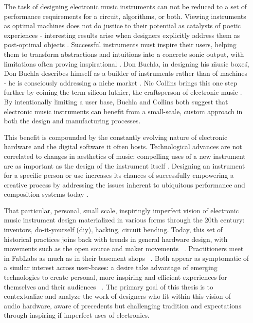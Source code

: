 The task of designing electronic music instruments can not be reduced to a set of performance requirements for a circuit, algorithms, or both. Viewing instruments as optimal machines does not do justice to their potential as catalysts of poetic experiences - interesting results arise when designers explicitly address them as post-optimal objects \cite{dunne2005}. Successful instruments must inspire their users, helping them to transform abstractions and intuitions into a concrete sonic output, with limitations often proving inspirational \cite{evens2005,rovan2009}. Don Buchla, in designing his \"music boxes\", Don Buchla describes himself as a builder of instruments rather than of machines - he is consciously addressing a niche market \cite{pinch2001}. Nic Collins brings this one step further by coining the term silicon luthier, the craftsperson of electronic music \cite{collins2008}. By intentionally limiting a user base, Buchla and Collins both suggest that electronic music instruments can benefit from a small-scale, custom approach in both the design and manufacturing processes. 

This benefit is compounded by the constantly evolving nature of electronic hardware and the digital software it often hosts. Technological advances are not correlated to changes in aesthetics of music: compelling uses of a new instrument are as important as the design of the instrument itself \cite{braun2000}. Designing an instrument for a specific person or use increases its chances of successfully empowering a creative process by addressing the issues inherent to ubiquitous performance and composition systems today \cite{armstrong2006,haslett2005}. 

That particular, personal, small scale, inspiringly imperfect vision of electronic music instrument design materialized in various forms through the 20th century: inventors, do-it-yourself (diy), hacking, circuit bending. Today, this set of historical practices joins back with trends in general hardware design, with movements such as the open source and maker movements ~\cite{mellis2014,perner2011}. Practitioners meet in FabLabs as much as in their basement shops ~\cite{mellis2011}. Both appear as symptomatic of a similar interest across user-bases: a desire take advantage of emerging technologies to create personal, more inspiring and efficient experiences for themselves and their audiences ~\cite{hermans2014}. The primary goal of this thesis is to contextualize and analyze the work of designers who fit within this vision of audio hardware, aware of precedents but challenging tradition and expectations through inspiring if imperfect uses of electronics.

